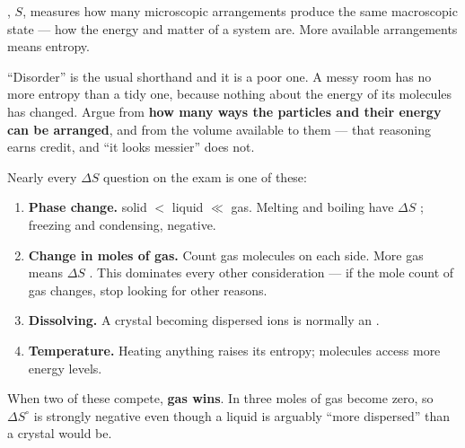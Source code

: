\documentclass{apchem-notes}
\begin{document}



, $S$, measures how many microscopic arrangements produce the
same macroscopic state --- how  the energy and
matter of a system are. More available arrangements means
 entropy.

\begin{apctrap}
``Disorder'' is the usual shorthand and it is a poor one. A messy room has
no more entropy than a tidy one, because nothing about the energy of its
molecules has changed. Argue from \textbf{how many ways the particles and
their energy can be arranged}, and from the volume available to them ---
that reasoning earns credit, and ``it looks messier'' does not.
\end{apctrap}


Nearly every $\Delta S$ question on the exam is one of these:

\begin{enumerate}[leftmargin=*,itemsep=0.35em]
  \item \textbf{Phase change.}
        solid $<$ liquid $\ll$ gas. Melting and boiling have
        $\Delta S$ ; freezing and condensing,
        negative.
  \item \textbf{Change in moles of gas.} Count gas molecules on each side.
        More gas means $\Delta S$ . This
        dominates every other consideration --- if the mole count of gas
        changes, stop looking for other reasons.
  \item \textbf{Dissolving.} A crystal becoming dispersed ions is normally
        an .
  \item \textbf{Temperature.} Heating anything raises its entropy;
        molecules access more energy levels.
\end{enumerate}

\begin{apcnote}
When two of these compete, \textbf{gas wins}. In
 three moles of gas become zero, so
$\Delta S^\circ$ is strongly negative even though a liquid is arguably
``more dispersed'' than a crystal would be.
\end{apcnote}
\end{document}
